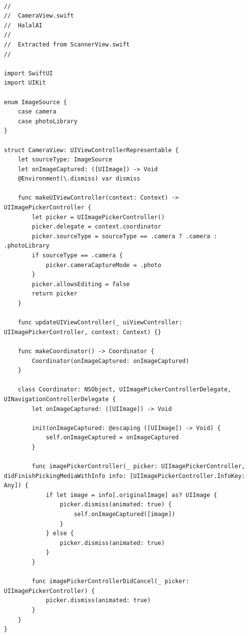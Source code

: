 \begin{lstlisting}[basicstyle=\tiny\ttfamily,breaklines=true]

//
//  CameraView.swift
//  HalalAI
//
//  Extracted from ScannerView.swift
//

import SwiftUI
import UIKit

enum ImageSource {
    case camera
    case photoLibrary
}

struct CameraView: UIViewControllerRepresentable {
    let sourceType: ImageSource
    let onImageCaptured: ([UIImage]) -> Void
    @Environment(\.dismiss) var dismiss

    func makeUIViewController(context: Context) -> UIImagePickerController {
        let picker = UIImagePickerController()
        picker.delegate = context.coordinator
        picker.sourceType = sourceType == .camera ? .camera : .photoLibrary
        if sourceType == .camera {
            picker.cameraCaptureMode = .photo
        }
        picker.allowsEditing = false
        return picker
    }

    func updateUIViewController(_ uiViewController: UIImagePickerController, context: Context) {}

    func makeCoordinator() -> Coordinator {
        Coordinator(onImageCaptured: onImageCaptured)
    }

    class Coordinator: NSObject, UIImagePickerControllerDelegate, UINavigationControllerDelegate {
        let onImageCaptured: ([UIImage]) -> Void

        init(onImageCaptured: @escaping ([UIImage]) -> Void) {
            self.onImageCaptured = onImageCaptured
        }

        func imagePickerController(_ picker: UIImagePickerController, didFinishPickingMediaWithInfo info: [UIImagePickerController.InfoKey: Any]) {
            if let image = info[.originalImage] as? UIImage {
                picker.dismiss(animated: true) {
                    self.onImageCaptured([image])
                }
            } else {
                picker.dismiss(animated: true)
            }
        }

        func imagePickerControllerDidCancel(_ picker: UIImagePickerController) {
            picker.dismiss(animated: true)
        }
    }
}
\end{lstlisting}

